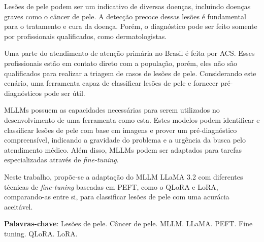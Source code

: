 \imprimircapa

\imprimirfolhaderosto*

% 	

% 

% 

\setlength{\absparsep}{18pt}
\begin{resumo}
	\SingleSpacing
	Lesões de pele podem ser um indicativo de diversas doenças, incluindo doenças graves como o câncer de pele. A detecção precoce dessas lesões é fundamental para o
	tratamento e cura da doença. Porém, o diagnóstico pode ser feito somente por profissionais qualificados, como dermatologistas.
	
	Uma parte do atendimento de atenção primária no Brasil é feita por \ac{ACS}. Esses profissionais estão em contato direto com a população, porém, eles não são
	qualificados para realizar a triagem de casos de lesões de pele. Considerando este cenário, uma ferramenta capaz de classificar lesões de pele e fornecer
	pré-diagnósticos pode ser útil.
	
	\acp{MLLM} possuem as capacidades necessárias para serem utilizados no desenvolvimento de uma ferramenta como esta. Estes modelos podem identificar e classificar
	lesões de pele com base em imagens e prover um pré-diagnóstico compreensível, indicando a gravidade do problema e a urgência da busca pelo atendimento médico. Além
	disso, \acp{MLLM} podem ser adaptados para tarefas especializadas através de \textit{fine-tuning}.
	
	Neste trabalho, propõe-se a adaptação do \ac{MLLM} \ac{LLaMA} 3.2 com diferentes técnicas de \textit{fine-tuning} baseadas em \ac{PEFT}, como o \ac{QLoRA} e
	\ac{LoRA}, comparando-as entre si, para classificar lesões de pele com uma acurácia aceitável.

	\textbf{Palavras-chave}: Lesões de pele. Câncer de pele. MLLM. LLaMA. PEFT. Fine tuning. QLoRA. LoRA.
\end{resumo}

